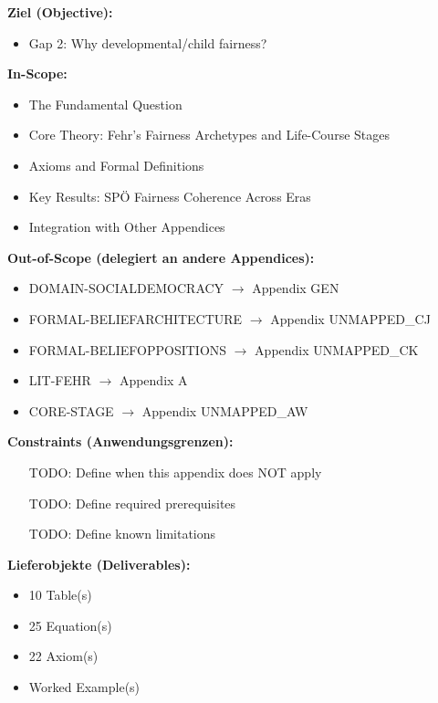 \begin{tcolorbox}[
    colback=orange!5!white,
    colframe=orange!75!black,
    title={\textbf{Appendix Scope: Ziel / In-Scope / Out-of-Scope / Constraints}},
    fonttitle=\bfseries
]

\textbf{Ziel (Objective):}
\begin{itemize}[nosep]
    \item Gap 2: Why developmental/child fairness?
\end{itemize}

\textbf{In-Scope:}
\begin{itemize}[nosep]
    \item The Fundamental Question
    \item Core Theory: Fehr's Fairness Archetypes and Life-Course Stages
    \item Axioms and Formal Definitions
    \item Key Results: SPÖ Fairness Coherence Across Eras
    \item Integration with Other Appendices
\end{itemize}

\textbf{Out-of-Scope (delegiert an andere Appendices):}
\begin{itemize}[nosep]
    \item DOMAIN-SOCIALDEMOCRACY $\rightarrow$ Appendix GEN
    \item FORMAL-BELIEFARCHITECTURE $\rightarrow$ Appendix UNMAPPED_CJ
    \item FORMAL-BELIEFOPPOSITIONS $\rightarrow$ Appendix UNMAPPED_CK
    \item LIT-FEHR $\rightarrow$ Appendix A
    \item CORE-STAGE $\rightarrow$ Appendix UNMAPPED_AW
\end{itemize}

\textbf{Constraints (Anwendungsgrenzen):}
\begin{itemize}[nosep]
    \item [TODO: Define when this appendix does NOT apply]
    \item [TODO: Define required prerequisites]
    \item [TODO: Define known limitations]
\end{itemize}

\textbf{Lieferobjekte (Deliverables):}
\begin{itemize}[nosep]
    \item 10 Table(s)
    \item 25 Equation(s)
    \item 22 Axiom(s)
    \item Worked Example(s)
\end{itemize}

\end{tcolorbox}



